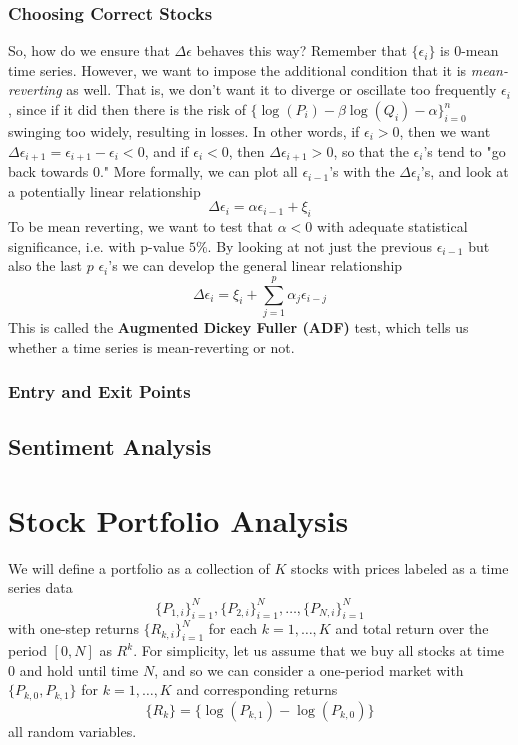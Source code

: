 \documentclass{article}
\begin{document}
\subsubsection{Choosing Correct Stocks}

So, how do we ensure that $\Delta \epsilon$ behaves this way? Remember that $\{\epsilon_i\}$ is $0$-mean time series. However, we want to impose the additional condition that it is \textit{mean-reverting} as well. That is, we don't want it to diverge or oscillate too frequently $\epsilon_i$, since if it did then there is the risk of $\{\log(P_i) - \beta \log(Q_i) - \alpha\}_{i=0}^n$ swinging too widely, resulting in losses. In other words, if $\epsilon_i > 0$, then we want $\Delta \epsilon_{i + 1} = \epsilon_{i+1} - \epsilon_i < 0$, and if $\epsilon_i < 0$, then $\Delta \epsilon_{i+1} > 0$, so that the $\epsilon_i$'s tend to "go back towards $0$." More formally, we can plot all $\epsilon_{i-1}$'s with the $\Delta \epsilon_i$'s, and look at a potentially linear relationship 
\[\Delta \epsilon_i = \alpha \epsilon_{i-1} + \xi_i\]
To be mean reverting, we want to test that $\alpha < 0$ with adequate statistical significance, i.e. with p-value $5\%$. By looking at not just the previous $\epsilon_{i-1}$ but also the last $p$ $\epsilon_i$'s we can develop the general linear relationship 
\[\Delta \epsilon_i = \xi_i + \sum_{j=1}^p \alpha_j \epsilon_{i - j}\]
This is called the \textbf{Augmented Dickey Fuller (ADF)} test, which tells us whether a time series is mean-reverting or not. 

\subsubsection{Entry and Exit Points}

\subsection{Sentiment Analysis}

\section{Stock Portfolio Analysis}

We will define a portfolio as a collection of $K$ stocks with prices labeled as a time series data 
\[\{P_{1,i}\}_{i=1}^N, \{P_{2,i}\}_{i = 1}^N, \ldots, \{P_{N,i}\}_{i=1}^N\]
with one-step returns $\{R_{k, i}\}_{i = 1}^{N}$ for each $k = 1, \ldots, K$ and total return over the period $[0, N]$ as $R^k$. For simplicity, let us assume that we buy all stocks at time $0$ and hold until time $N$, and so we can consider a one-period market with $\{P_{k, 0}, P_{k, 1}\}$ for $k = 1, \ldots, K$ and corresponding returns 
\[\{R_k\} = \{\log(P_{k, 1}) - \log(P_{k, 0})\}\]
all random variables. 
\end{document}
